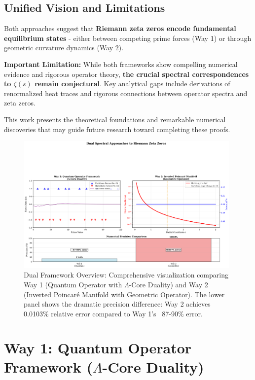 \documentclass[12pt]{article}
\begin{document}
\subsection{Unified Vision and Limitations}

Both approaches suggest that \textbf{Riemann zeta zeros encode fundamental equilibrium states} - either between competing prime forces (Way 1) or through geometric curvature dynamics (Way 2).

\textbf{Important Limitation:} While both frameworks show compelling numerical evidence and rigorous operator theory, \textbf{the crucial spectral correspondences to $\zeta(s)$ remain conjectural}. Key analytical gaps include derivations of renormalized heat traces and rigorous connections between operator spectra and zeta zeros.

This work presents the theoretical foundations and remarkable numerical discoveries that may guide future research toward completing these proofs.

\begin{figure}[ht]
\centering
\includegraphics[width=0.98\textwidth]{dual_framework_overview.png}
\caption{Dual Framework Overview: Comprehensive visualization comparing Way 1 (Quantum Operator with $\Lambda$-Core Duality) and Way 2 (Inverted Poincaré Manifold with Geometric Operator). The lower panel shows the dramatic precision difference: Way 2 achieves 0.0103\% relative error compared to Way 1's ~87-90\% error.}
\label{fig:dual_overview}
\end{figure}

\section{Way 1: Quantum Operator Framework ($\Lambda$-Core Duality)}
\end{document}
